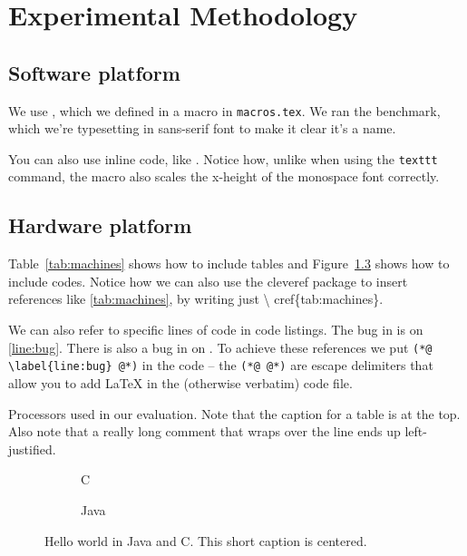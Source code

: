 \chapter{Experimental Methodology}
\label{cha:methodology}

\section{Software platform}
\label{sec:softplat}

We use \jikesrvm, which we defined in a macro in
\texttt{macros.tex}. We ran the \avrora benchmark, which we're
typesetting in sans-serif font to make it clear it's a name.

You can also use inline code, like . Notice how, unlike when
using the \texttt{texttt} command, the  macro also scales the
x-height of the monospace font correctly.

\section{Hardware platform}
\label{sec:hardplat}

Table~\ref{tab:machines} shows how to include tables and
Figure~\ref{fig:helloworld} shows how to include codes. Notice how we
can also use the \textsf{cleveref} package to insert references like
\cref{tab:machines}, by writing just \textbackslash
cref\{tab:machines\}.

We can also refer to specific lines of code in code listings. The bug
in  is on \cref{line:bug}. There is also a bug in
 on
. To achieve these
references we put \texttt{(*@ \textbackslash label\{line:bug\} @*)} in
the code -- the \texttt{(*@ @*)} are escape delimiters that allow you
to add LaTeX in the (otherwise verbatim) code file.

\begin{table*}
  \centering

  \caption{Processors used in our evaluation.  Note that the caption
    for a table is at the top.  Also note that a really long comment
    that wraps over the line ends up left-justified.}
  
  \label{tab:machines}
  
\end{table*}

\begin{figure}
  \centering
  \begin{subfigure}[b]{\textwidth}
      
      \caption{C}
      \label{fig:c:hello}
  \end{subfigure}

  \begin{subfigure}[b]{\textwidth}
      
      \caption{Java}
      \label{fig:java:hello}
  \end{subfigure}

  \caption{Hello world in Java and C. This short caption is centered.}
  \label{fig:helloworld}
\end{figure}



